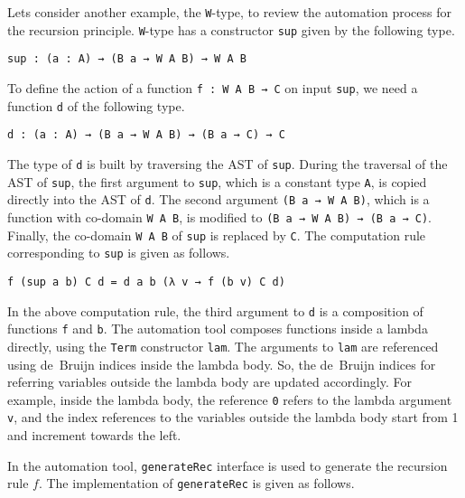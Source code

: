 \documentclass[sigplan,10pt]{acmart}
\begin{document}
Lets consider another example, the {\tt W}-type, to review the automation process for the recursion principle. {\tt W}-type has a constructor {\tt sup} given by the following type.

\begin{center}
\begingroup
\begin{BVerbatim}
sup : (a : A) → (B a → W A B) → W A B
\end{BVerbatim}
\endgroup
\end{center}

To define the action of a function {\tt f : W A B → C} on input {\tt sup}, we need a function {\tt d} of the following type.
\begin{center}
\begingroup
\begin{BVerbatim}
d : (a : A) → (B a → W A B) → (B a → C) → C
\end{BVerbatim}
\endgroup
\end{center}

The type of {\tt d} is built by traversing the AST of {\tt sup}. During the traversal of the AST of {\tt sup}, the first argument to {\tt sup}, which is a constant type {\tt A}, is copied directly into the AST of {\tt d}. The second argument {\tt (B a  → W A B)}, which is a function with co-domain {\tt W A B}, is modified to {\tt (B a  → W A B) → (B a → C)}. Finally, the co-domain {\tt W A B} of {\tt sup} is replaced by {\tt C}. The computation rule corresponding to {\tt sup} is given as follows.
\begin{center}
\begingroup
\begin{BVerbatim}
f (sup a b) C d = d a b (λ v → f (b v) C d)
\end{BVerbatim}
\endgroup
\end{center}

In the above computation rule, the third argument to {\tt d} is a composition of functions {\tt f} and {\tt b}. The automation tool composes functions inside a lambda directly, using the \texttt{Term} constructor {\tt lam}. The arguments to {\tt lam} are referenced using de~Bruijn indices inside the lambda body. So, the de~Bruijn indices for referring variables outside the lambda body are updated accordingly. For example, inside the lambda body, the reference {\tt 0} refers to the lambda argument {\tt v}, and the index references to the variables outside the lambda body start from 1 and increment towards the left.

In the automation tool, {\tt generateRec} interface is used to generate the recursion rule $f$. The implementation of {\tt generateRec} is given as follows.
\end{document}
